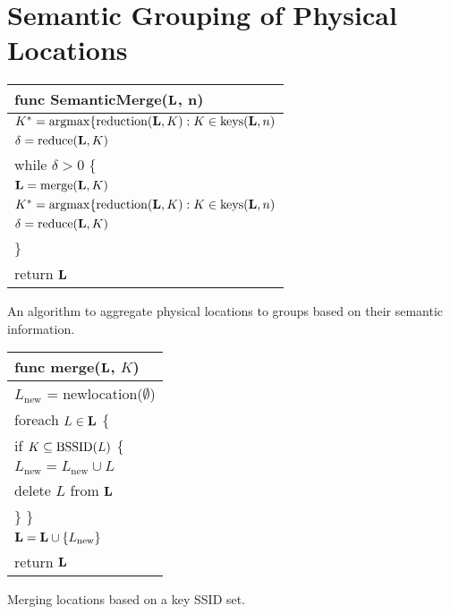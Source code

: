 \section{Semantic Grouping of Physical Locations}

\begin{algorithm}[t]
    \begin{tabular}{|l|} \hline
        func SemanticMerge($\mathbf{L}$, n) \\ \hline
        $K^* = \mathrm{argmax}\{
            \mathrm{reduction}(\mathbf{L}, K) : K\in\mathrm{keys}(\mathbf{L}, n)$\\
        $\delta = \mathrm{reduce}(\mathbf{L}, K)$ \\
        while $\delta > 0$ \{ \\
        \RRR $\mathbf{L} = \mathrm{merge}(\mathbf{L}, K)$ \\
        \RRR $K^* = \mathrm{argmax}\{
            \mathrm{reduction}(\mathbf{L}, K) : K\in\mathrm{keys}(\mathbf{L}, n)$\\
        \RRR $\delta = \mathrm{reduce}(\mathbf{L}, K)$ \\
        \}\\
        return $\mathbf{L}$ \\ \hline
    \end{tabular}
    \vspace{0.4cm}
    \caption{An algorithm to aggregate physical locations to groups based on
    their semantic information.}
    \label{alg:semantic}
\end{algorithm}

\begin{algorithm}[t]
    \centering
    \begin{tabular}{|l|} \hline
        func merge($\mathbf{L}$, $K$) \\ \hline
        $L_\mathrm{new}$ = newlocation($\emptyset$)\\
        foreach $L\in\mathbf{L}$ \{ \\
            \RRR if $K\subseteq\mathrm{BSSID}(L)$ \{ \\
            \RRR \RRR $L_\mathrm{new} = L_\mathrm{new}\cup L$ \\
            \RRR \RRR delete $L$ from $\mathbf{L}$ \\
            \RRR \}
        \} \\
        $\mathbf{L} = \mathbf{L}\cup\{L_\mathrm{new}\}$ \\
        return $\mathbf{L}$ \\ \hline
    \end{tabular}
    \vspace{0.4cm}
    \caption{Merging locations based on a key SSID set.}
    \label{alg:merge}
\end{algorithm}













